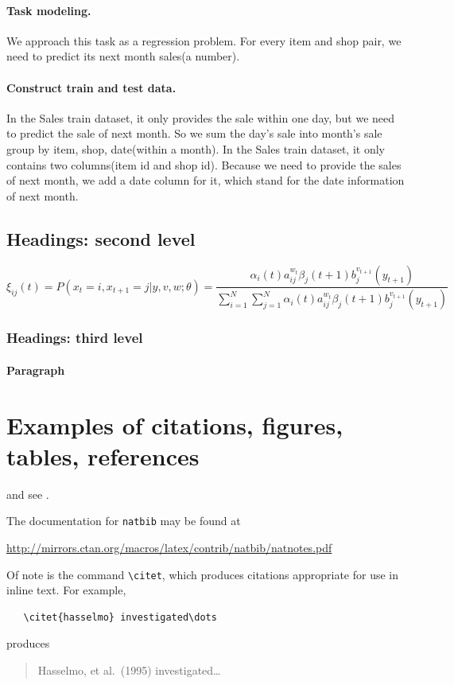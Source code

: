 \documentclass{article}
\begin{document}
\paragraph{Task modeling.}
We approach this task as a regression problem. For every item and shop pair, we need to predict its next month sales(a number).
\paragraph{Construct train and test data.}
In the Sales train dataset, it only provides the sale within one day, but we need to predict the sale of next month. So we sum the day's sale into month's sale group by item, shop, date(within a month).
In the Sales train dataset, it only contains two columns(item id and shop id). Because we need to provide the sales of next month, we add a date column for it, which stand for the date information of next month.

\subsection{Headings: second level}
\lipsum[5]
\begin{equation}
	\xi _{ij}(t)=P(x_{t}=i,x_{t+1}=j|y,v,w;\theta)= {\frac {\alpha _{i}(t)a^{w_t}_{ij}\beta _{j}(t+1)b^{v_{t+1}}_{j}(y_{t+1})}{\sum _{i=1}^{N} \sum _{j=1}^{N} \alpha _{i}(t)a^{w_t}_{ij}\beta _{j}(t+1)b^{v_{t+1}}_{j}(y_{t+1})}}
\end{equation}

\subsubsection{Headings: third level}
\lipsum[6]

\paragraph{Paragraph}
\lipsum[7]

\section{Examples of citations, figures, tables, references}
\label{sec:others}
\lipsum[8] \cite{kour2014real,kour2014fast} and see \cite{hadash2018estimate}.

The documentation for \verb+natbib+ may be found at
\begin{center}
	\url{http://mirrors.ctan.org/macros/latex/contrib/natbib/natnotes.pdf}
\end{center}
Of note is the command \verb+\citet+, which produces citations
appropriate for use in inline text.  For example,
\begin{verbatim}
   \citet{hasselmo} investigated\dots
\end{verbatim}
produces
\begin{quote}
	Hasselmo, et al.\ (1995) investigated\dots
\end{quote}
\end{document}
